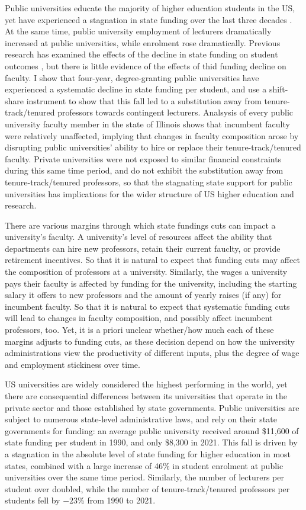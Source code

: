 Public universities educate the majority of higher education students in the US, yet have experienced a stagnation in state funding over the last three decades .
At the same time, public university employment of lecturers dramatically increased at public universities, while enrolment rose dramatically.
Previous research has examined the effects of the decline in state funding on student outcomes \citep{NBERw23736,NBERw27885}, but there is little evidence of the effects of thid funding decline on faculty.
I show that four-year, degree-granting public universities have experienced a systematic decline in state funding per student, and use a shift-share instrument to show that this fall led to a substitution away from tenure-track/tenured professors towards contingent lecturers.
Analsysis of every public university faculty member in the state of Illinois shows that incumbent faculty were relatively unaffected, implying that changes in faculty composition arose by disrupting public universities' ability to hire or replace their tenure-track/tenured faculty. 
Private universities were not exposed to similar financial constraints during this same time period, and do not exhibit the substitution away from tenure-track/tenured professors, so that the stagnating state support for public universities has implications for the wider structure of US higher education and research.

There are various margins through which state fundings cuts can impact a university's faculty.
A university's level of resources affect the ability that departments can hire new professors, retain their current fauclty, or provide retirement incentives.
So that it is natural to expect that funding cuts may affect the composition of professors at a university.
Similarly, the wages a university pays their faculty is affected by funding for the university, including the starting salary it offers to new professors and the amount of yearly raises (if any) for incumbent faculty.
So that it is natural to expect that systematic funding cuts will lead to changes in faculty composition, and possibly affect incumbent professors, too.
Yet, it is a priori unclear whether/how much each of these margins adjusts to funding cuts, as these decision depend on how the university administrations view the productivity of different inputs, plus the degree of wage and employment stickiness over time.

US universities are widely considered the highest performing in the world, yet there are consequential differences between its universities that operate in the private sector and those established by state governments.
Public universities are subject to numerous state-level administrative laws, and rely on their state governments for funding: an average public university received around \$11,600 of state funding per student in 1990, and only \$8,300 in 2021.
This fall is driven by a stagnation in the absolute level of state funding for higher education in most states, combined with a large increase of 46\% in student enrolment at public universities over the same time period.
Similarly, the number of lecturers per student over doubled, while the number of tenure-track/tenured professors per students fell by $-23$\% from 1990 to 2021.

